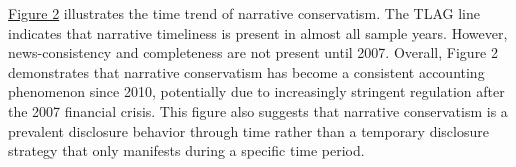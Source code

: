 \documentclass[letterpaper,12pt]{article}
\begin{document}
\begin{spacing}{1.5}
\hyperref[fig2]{Figure 2} illustrates the time trend of narrative conservatism. The TLAG line indicates that narrative timeliness is present in almost all sample years. However, news-consistency and completeness are not present until 2007. Overall, Figure 2 demonstrates that narrative conservatism has become a consistent accounting phenomenon since 2010, potentially due to increasingly stringent regulation after the 2007 financial crisis. This figure also suggests that narrative conservatism is a prevalent disclosure behavior through time rather than a temporary disclosure strategy that only manifests during a specific time period.

\begin{comment}
	\subsection{Managerial Incentives to Withhold Bad News}
	\noindent We inspect how narrative conservatism varies in three settings where managers have incentives to disclose or withhold bad news. First, when firms announce a seasoned equity offering (SEO), managers have incentives to manage investor perceptions upward through earnings \cite{teohEarningsManagementUnderperformance1998} and disclosure \cite{langVoluntaryDisclosureEquity2000}. Similarly, we expect managers to be less narratively conservative during a SEO. Second, when executives anticipate a high value stock option grant, they have incentives to disclose bad news prior to the grant to ensure a lower option exercise price at the grant date \cite{aboodyCEOStockOption2000,bakerStockOptionCompensation2003,mcanallyExecutiveStockOptions2008}. Therefore, we expect narrative disclosure to be more conservative when firms grant stock option of high value to their executives. Third, we examine the role of litigation risk. Here, we do not have an ex-ante prediction because prior literature documents mixed evidence. On the one hand, when firms face high litigation risk, managers may have incentives to disclose bad news voluntarily to avoid being sued or to reduce the cost of resolving litigation that follows bad news \cite{skinnerWhyFirmsVoluntarily1994, skinnerEarningsDisclosuresStockholder1997}. On the other hand, bad news disclosure may itself trigger litigation \cite{francisShareholderLitigationCorporate1994}, creating incentives to withhold bad news \cite{rogersShareholderLitigationChanges2009}. 
	

\end{comment}
\end{spacing}
\end{document}
